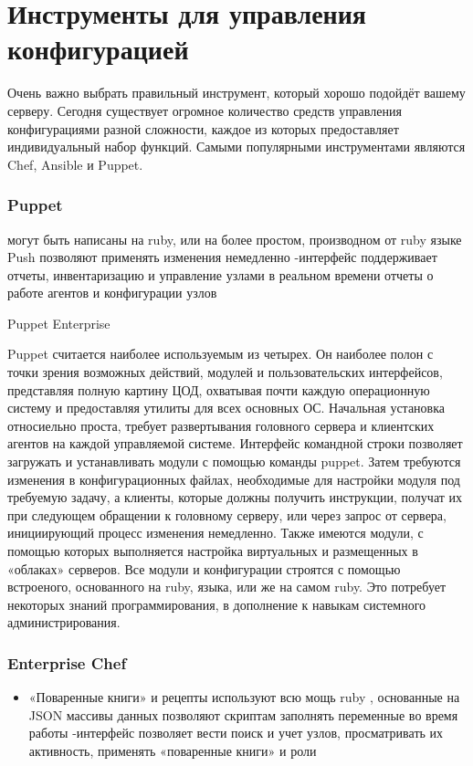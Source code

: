 \documentclass{../industrial-development}
\begin{document}
\lecturenotes

\section{Инструменты для управления конфигурацией}

\lecturenotes
Очень важно выбрать правильный инструмент, который хорошо подойдёт вашему серверу. Сегодня существует огромное количество средств управления конфигурациями разной сложности, каждое из которых предоставляет индивидуальный набор функций. Самыми популярными инструментами являются Chef, Ansible и Puppet.
~\cite{Instruments}
\begin{frame} \frametitle{Puppet}
  
  \begin{itemize}
 могут быть написаны на ruby, или на более простом, производном от ruby языке
 Push позволяют применять изменения немедленно
-интерфейс поддерживает отчеты, инвентаризацию и управление узлами в реальном времени
 отчеты о работе агентов и конфигурации узлов

  \end{itemize}
\end{frame}

\lecturenotes
Puppet Enterprise

Puppet считается наиболее используемым из четырех. Он наиболее полон с точки зрения возможных действий, модулей и пользовательских интерфейсов, представляя полную картину ЦОД, охватывая почти каждую операционную систему и предоставляя утилиты для всех основных ОС. Начальная установка относиельно проста, требует развертывания головного сервера и клиентских агентов на каждой управляемой системе.
Интерфейс командной строки позволяет загружать и устанавливать модули с помощью команды puppet. Затем требуются изменения в конфигурационных файлах, необходимые для настройки модуля под требуемую задачу, а клиенты, которые должны получить инструкции, получат их при следующем обращении к головному серверу, или через запрос от сервера, инициирующий процесс изменения немедленно.
Также имеются модули, с помощью которых выполняется настройка виртуальных и размещенных в «облаках» серверов. Все модули и конфигурации строятся с помощью встроеного, основанного на ruby, языка, или же на самом ruby. Это потребует некоторых знаний программирования, в дополнение к навыкам системного администрирования.
~\cite{Instruments}
\begin{frame} \frametitle{Enterprise Chef}
  
  \begin{itemize}
\item«Поваренные книги» и рецепты используют всю мощь ruby
, основанные на JSON массивы данных позволяют скриптам заполнять переменные во время работы
-интерфейс позволяет вести поиск и учет узлов, просматривать их активность, применять «поваренные книги» и роли
  \end{itemize}
\end{frame}
\end{document}
